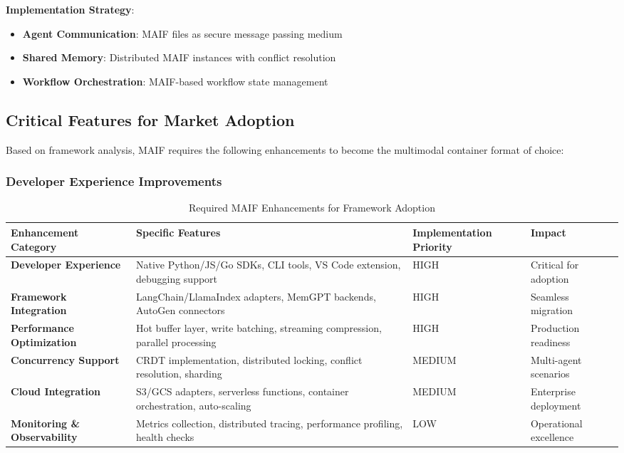 \documentclass[conference]{IEEEtran}
\begin{document}
\textbf{Implementation Strategy}:
\begin{itemize}[leftmargin=*]
\item \textbf{Agent Communication}: MAIF files as secure message passing medium
\item \textbf{Shared Memory}: Distributed MAIF instances with conflict resolution
\item \textbf{Workflow Orchestration}: MAIF-based workflow state management
\end{itemize}

\subsection{Critical Features for Market Adoption}

Based on framework analysis, MAIF requires the following enhancements to become the multimodal container format of choice:

\subsubsection{Developer Experience Improvements}

\begin{table*}[!t]
\renewcommand{\arraystretch}{1.3}
\caption{Required MAIF Enhancements for Framework Adoption}
\label{tab:maif-enhancements}
\centering
\footnotesize
\begin{tabular}{p{3cm}p{5cm}p{4cm}p{3cm}}
\toprule
\textbf{Enhancement Category} & \textbf{Specific Features} & \textbf{Implementation Priority} & \textbf{Impact} \\
\midrule
\textbf{Developer Experience} & Native Python/JS/Go SDKs, CLI tools, VS Code extension, debugging support & HIGH & Critical for adoption \\
\textbf{Framework Integration} & LangChain/LlamaIndex adapters, MemGPT backends, AutoGen connectors & HIGH & Seamless migration \\
\textbf{Performance Optimization} & Hot buffer layer, write batching, streaming compression, parallel processing & HIGH & Production readiness \\
\textbf{Concurrency Support} & CRDT implementation, distributed locking, conflict resolution, sharding & MEDIUM & Multi-agent scenarios \\
\textbf{Cloud Integration} & S3/GCS adapters, serverless functions, container orchestration, auto-scaling & MEDIUM & Enterprise deployment \\
\textbf{Monitoring \& Observability} & Metrics collection, distributed tracing, performance profiling, health checks & LOW & Operational excellence \\
\bottomrule
\end{tabular}
\end{table*}
\end{document}
